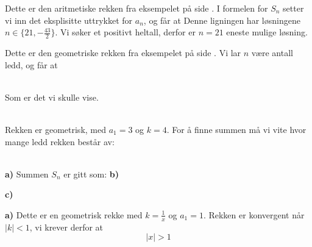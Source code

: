 Dette er den aritmetiske rekken fra eksempelet på side \pageref{arrekeks}. I formelen for $ S_n $ setter vi inn det eksplisitte uttrykket for $ a_n $, og får at	
Denne ligningen har løsningene $ {n\in \big\lbrace21, -\frac{43}{2} \big\rbrace}$. Vi søker et positivt heltall, derfor er $ {n=21} $ eneste mulige løsning.

Dette er den geometriske rekken fra eksempelet på side \pageref{gerekeks}. Vi lar $ n $ være antall ledd, og får at

 \\
\vs
{}
Som er det vi skulle vise.

 \\
Rekken er geometrisk, med $ {a_1=3} $ og $ {k=4} $. For å finne summen må vi vite hvor mange ledd rekken består av:

 \\
\textbf{a)}
Summen $ S_n $ er gitt som:
\textbf{b)} 

\textbf{c)} 


\textbf{a)} Dette er en geometrisk rekke med $ {k=\frac{1}{x} }$ og ${ a_1 = 1} $. Rekken er konvergent når $ {|k|<1} $, vi krever derfor at
\[ |x|>1  \] 

